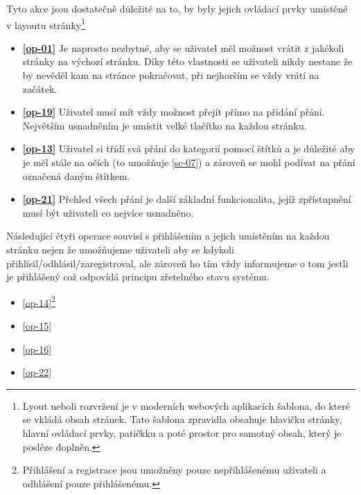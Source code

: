 Tyto akce jsou dostatečně důležité na to, by byly jejich ovládací prvky umístěné v layoutu stránky\footnote{Lyout neboli rozvržení je v moderních webových aplikacích šablona, do které se vkládá obsah stránek. Tato šablona zpravidla obsahuje hlavičku stránky, hlavní ovládací prvky, patičkku a poté prostor pro samotný obsah, který je posléze doplněn.}
\begin{itemize}
\item \textbf{\ref{op-01}} Je naprosto nezbytné, aby se uživatel měl možnost vrátit z jakékoli stránky na výchozí stránku\cite{molich1990improving}. Díky této vlastnosti se uživateli nikdy nestane že by nevěděl kam na stránce pokračovat, při nejhorším se vždy vrátí na začátek.
\item \textbf{\ref{op-19}} Uživatel musí mít vždy možnost přejít přímo na přidání přání. Největším usnadněním je umístit velké tlačítko na každou stránku.
\item \textbf{\ref{op-13}} Uživatel si třídí svá přání do kategorií pomocí štítků a je důležité aby je měl stále na očích (to umožňuje \ref{sc-07}) a zároveň se mohl podívat na přání označená daným štítkem.
\item \textbf{\ref{op-21}} Přehled všech přání je další základní funkcionalita, jejíž zpřístupnění musí být uživateli co nejvíce usnadněno.
\end{itemize}
Následující čtyři operace souvisí s přihlášením a jejich umístěním na každou stránku nejen že umožňujeme uživateli aby se kdykoli přihlísil/odhlásil/zaregistroval, ale zároveň ho tím vždy informujeme o tom jestli je přihlášený což odpovídá principu zřetelného stavu systému\cite{molich1990improving}.
\begin{multicols}{2}
\begin{itemize}
\item \ref{op-14}\footnote{Přihlášení a registrace jsou umožněny pouze nepřihlášenému uživateli a odhlášení pouze přihlášenému.\label{footnote-login}}
\item \ref{op-15}
\item \ref{op-16}
\item \ref{op-22}
\end{itemize}
\end{multicols}

